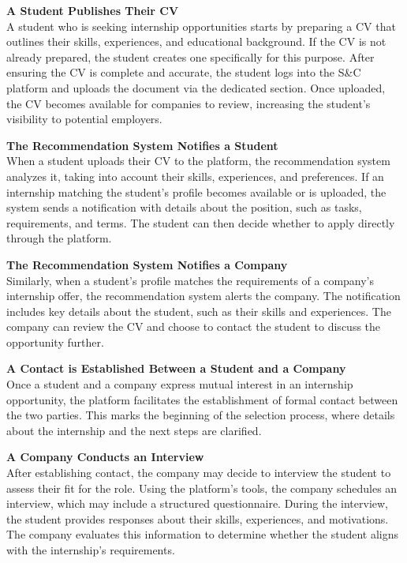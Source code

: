 \documentclass[12pt]{article}
\begin{document}
\vspace{0.5cm}

\textbf{A Student Publishes Their CV} \\
A student who is seeking internship opportunities starts by preparing a CV that outlines their skills, experiences, and educational background. If the CV is not already prepared, the student creates one specifically for this purpose. After ensuring the CV is complete and accurate, the student logs into the S\&C platform and uploads the document via the dedicated section. Once uploaded, the CV becomes available for companies to review, increasing the student’s visibility to potential employers. %

\vspace{0.5cm}

\textbf{The Recommendation System Notifies a Student} \\
When a student uploads their CV to the platform, the recommendation system analyzes it, taking into account their skills, experiences, and preferences. If an internship matching the student’s profile becomes available or is uploaded, the system sends a notification with details about the position, such as tasks, requirements, and terms. The student can then decide whether to apply directly through the platform.

\vspace{0.5cm}

\textbf{The Recommendation System Notifies a Company} \\
Similarly, when a student’s profile matches the requirements of a company’s internship offer, the recommendation system alerts the company. The notification includes key details about the student, such as their skills and experiences. The company can review the CV and choose to contact the student to discuss the opportunity further.

\vspace{0.5cm}

\textbf{A Contact is Established Between a Student and a Company} \\
Once a student and a company express mutual interest in an internship opportunity, the platform facilitates the establishment of formal contact between the two parties. This marks the beginning of the selection process, where details about the internship and the next steps are clarified.

\vspace{0.5cm}

\textbf{A Company Conducts an Interview} \\
After establishing contact, the company may decide to interview the student to assess their fit for the role. Using the platform’s tools, the company schedules an interview, which may include a structured questionnaire. During the interview, the student provides responses about their skills, experiences, and motivations. The company evaluates this information to determine whether the student aligns with the internship’s requirements.
\end{document}
